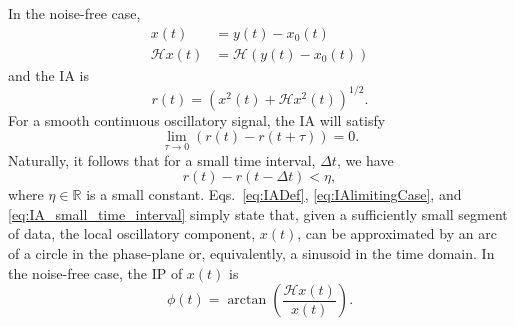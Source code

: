 \documentclass[a4paper]{IEEEtran}
\begin{document}
In the noise-free case, 
\begin{align}
	x\left( t \right) &= y\left( t \right) - x_0\left( t \right) \\
	\mathcal{H}x\left( t \right) &= \mathcal{H}\left(y\left( t \right) - x_0\left( t \right)\right)
\end{align}
and the IA is
\begin{equation}\label{eq:IADef}
    r\left( t \right) = \left( x^2(t) + \mathcal{H}x^2(t)\right)^{1/2}.
\end{equation}
For a smooth continuous oscillatory signal, the IA will satisfy
\begin{equation}\label{eq:IAlimitingCase}
\mathop {\lim }\limits_{\tau  \to 0} \left( r\left( t \right) - r\left( t + \tau \right) \right) = 0.
\end{equation}
Naturally, it follows that for a small time interval, $\Delta t$, we have
\begin{equation}\label{eq:IA_small_time_interval}
    r(t)-r(t-\Delta t) < \eta,
\end{equation}
where $\eta \in \mathbb{R}$ is a small constant. Eqs.~\ref{eq:IADef}, \ref{eq:IAlimitingCase}, and \ref{eq:IA_small_time_interval} simply state that, given a sufficiently small segment of data, the local oscillatory component, $x(t)$, can be approximated by an arc of a circle in the phase-plane or, equivalently, a sinusoid in the time domain. In the noise-free case, the IP of $x(t)$ is
\begin{equation}\label{IPdef}
    \phi \left( t \right) = \arctan \left( \frac{\mathcal{H}x\left( t \right)}
    {x\left( t \right)} \right).
\end{equation}
\end{document}
